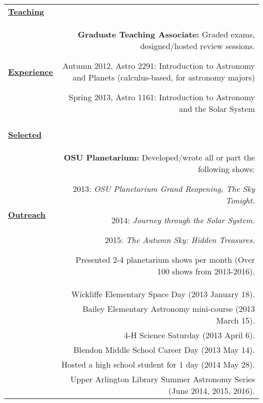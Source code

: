 \documentclass[letterpaper,12pt]{article}
\begin{document}
\begin{longtable}{LR}
\underline{\textbf{Teaching}}\\\underline{\textbf{Experience}} &  
\textbf{Graduate Teaching Associate:}  Graded exams, designed/hosted review sessions.
\begin{compactitem}
\item Autumn 2012, Astro 2291:  Introduction to Astronomy and Planets (calculus-based, for astronomy majors)
\item Spring   2013, Astro 1161:  Introduction to Astronomy and the Solar System
\end{compactitem}\\
\\



\underline{\textbf{Selected}}\\\underline{\textbf{Outreach}} 
&\textbf{OSU Planetarium:} Developed/wrote all or part the following shows:
\begin{compactitem}
\item 2013:  \textit{OSU Planetarium Grand Reopening, The Sky Tonight.}
\item 2014:  \textit{Journey through the Solar System.}
\item 2015:  \textit{The Autumn Sky:  Hidden Treasures.}
\end{compactitem}

\noindent Presented 2-4 planetarium shows per month (Over 100 shows from 2013-2016).\\
&Wickliffe Elementary Space Day (2013 January 18).\\
&Bailey Elementary Astronomy mini-course (2013 March 15).\\
&4-H Science Saturday (2013 April 6).\\
&Blendon Middle School Career Day (2013 May 14).\\
&Hosted a high school student for 1 day (2014 May 28).\\
&Upper Arlington Library Summer Astronomy Series (June 2014, 2015, 2016).\\

\end{longtable}
\end{document}
